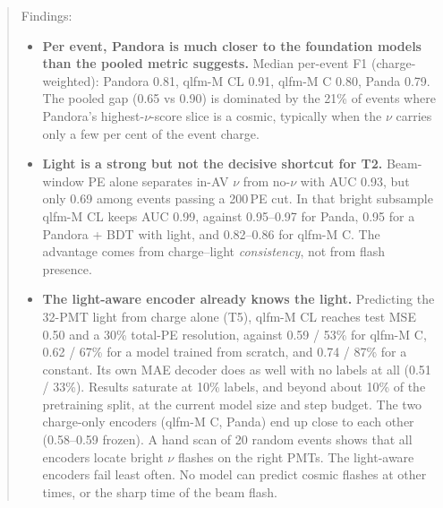 \documentclass[11pt,a4paper]{article}
\begin{document}
\begin{abstract}
Findings:
\begin{itemize}
  \item \textbf{Per event, Pandora is much closer to the foundation models than the pooled metric suggests.} Median per-event F1 (charge-weighted): Pandora 0.81, qlfm-M CL 0.91, qlfm-M C 0.80, Panda 0.79. The pooled gap (0.65 vs 0.90) is dominated by the 21\% of events where Pandora's highest-$\nu$-score slice is a cosmic, typically when the $\nu$ carries only a few per cent of the event charge.
  \item \textbf{Light is a strong but not the decisive shortcut for T2.} Beam-window PE alone separates in-AV $\nu$ from no-$\nu$ with AUC 0.93, but only 0.69 among events passing a 200\,PE cut. In that bright subsample qlfm-M CL keeps AUC 0.99, against 0.95--0.97 for Panda, 0.95 for a Pandora + BDT with light, and 0.82--0.86 for qlfm-M C. The advantage comes from charge--light \emph{consistency}, not from flash presence.
  \item \textbf{The light-aware encoder already knows the light.} Predicting the 32-PMT light from charge alone (T5), qlfm-M CL reaches test MSE 0.50 and a 30\% total-PE resolution, against 0.59 / 53\% for qlfm-M C, 0.62 / 67\% for a model trained from scratch, and 0.74 / 87\% for a constant. Its own MAE decoder does as well with no labels at all (0.51 / 33\%). Results saturate at 10\% labels, and beyond about 10\% of the pretraining split, at the current model size and step budget. The two charge-only encoders (qlfm-M C, Panda) end up close to each other (0.58--0.59 frozen). A hand scan of 20 random events shows that all encoders locate bright $\nu$ flashes on the right PMTs. The light-aware encoders fail least often. No model can predict cosmic flashes at other times, or the sharp time of the beam flash.
\end{itemize}
\end{abstract}

\tableofcontents
\clearpage

\end{document}
